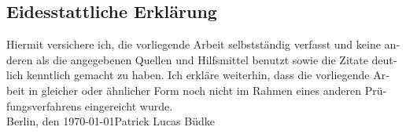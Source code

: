 \newpage
\begin{otherlanguage}{ngerman}
\thispagestyle{empty}
\section*{Eidesstattliche Erklärung}
\thispagestyle{empty}
Hiermit versichere ich, die vorliegende Arbeit selbstständig verfasst und keine anderen als die angegebenen Quellen und Hilfsmittel benutzt sowie die Zitate deutlich kenntlich gemacht zu haben.
\newline
Ich erkläre weiterhin, dass die vorliegende Arbeit in gleicher oder ähnlicher Form noch nicht im Rahmen eines
anderen Prüfungsverfahrens eingereicht wurde. 
\vspace{4\baselineskip}\\
Berlin, den \today \hfill Patrick Lucas Büdke 
\vspace{4\baselineskip}\\
\end{otherlanguage}